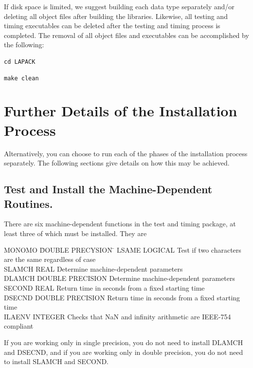 \documentclass[11pt]{report}
\begin{document}
If disk space is limited, we suggest building each data type separately
and/or deleting all object files after building the libraries.  Likewise, all
testing and timing executables can be deleted after the testing and timing
process is completed.  The removal of all object files and executables
can be accomplished by the following:

\begin{list}{}{}
\item \texttt{cd LAPACK}
\item \texttt{make clean}
\end{list}

\section{Further Details of the Installation Process}\label{furtherdetails}

Alternatively, you can choose to run each of the phases of the
installation process separately.  The following sections give details
on how this may be achieved.

\subsection{Test and Install the Machine-Dependent Routines.}

There are six machine-dependent functions in the test and timing
package, at least three of which must be installed.  They are

\begin{tabbing}
MONOMO  \=  DOUBLE PRECYSION  \=  \kill
LSAME   \>  LOGICAL      \> Test if two characters are the same regardless of case \\
SLAMCH  \>  REAL  \> Determine machine-dependent parameters \\
DLAMCH  \>  DOUBLE PRECISION \> Determine machine-dependent parameters \\
SECOND  \>  REAL  \> Return time in seconds from a fixed starting time \\
DSECND  \>  DOUBLE PRECISION  \> Return time in seconds from a fixed starting time\\
ILAENV  \>  INTEGER \> Checks that NaN and infinity arithmetic are IEEE-754 compliant
\end{tabbing}

\noindent
If you are working only in single precision, you do not need to install
DLAMCH and DSECND, and if you are working only in double precision,
you do not need to install SLAMCH and SECOND.
\end{document}

